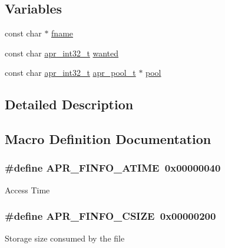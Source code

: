\subsection*{Variables}
\begin{DoxyCompactItemize}
\item 
const char $\ast$ \hyperlink{group__apr__file__stat_ga6a2fc0c236288b07ce5bd1335ca89fa2}{fname}
\item 
const char \hyperlink{group__apr__platform_ga21ef1e35fd3ff9be386f3cb20164ff02}{apr\+\_\+int32\+\_\+t} \hyperlink{group__apr__file__stat_ga48805d2a6845252444835c7809c73ade}{wanted}
\item 
const char \hyperlink{group__apr__platform_ga21ef1e35fd3ff9be386f3cb20164ff02}{apr\+\_\+int32\+\_\+t} \hyperlink{structapr__pool__t}{apr\+\_\+pool\+\_\+t} $\ast$ \hyperlink{group__apr__file__stat_ga51fbc0d90e2519e2e42e03c5dd9f441b}{pool}
\end{DoxyCompactItemize}


\subsection{Detailed Description}


\subsection{Macro Definition Documentation}
\subsubsection[{\texorpdfstring{A\+P\+R\+\_\+\+F\+I\+N\+F\+O\+\_\+\+A\+T\+I\+ME}{APR_FINFO_ATIME}}]{\setlength{\rightskip}{0pt plus 5cm}\#define A\+P\+R\+\_\+\+F\+I\+N\+F\+O\+\_\+\+A\+T\+I\+ME~0x00000040}\hypertarget{group__apr__file__stat_ga17d7656d02a35ffc05afe22032a8da15}{}\label{group__apr__file__stat_ga17d7656d02a35ffc05afe22032a8da15}
Access Time 
\subsubsection[{\texorpdfstring{A\+P\+R\+\_\+\+F\+I\+N\+F\+O\+\_\+\+C\+S\+I\+ZE}{APR_FINFO_CSIZE}}]{\setlength{\rightskip}{0pt plus 5cm}\#define A\+P\+R\+\_\+\+F\+I\+N\+F\+O\+\_\+\+C\+S\+I\+ZE~0x00000200}\hypertarget{group__apr__file__stat_gaf87a09b89935d730cb1ade80d5b6ada0}{}\label{group__apr__file__stat_gaf87a09b89935d730cb1ade80d5b6ada0}
Storage size consumed by the file 
